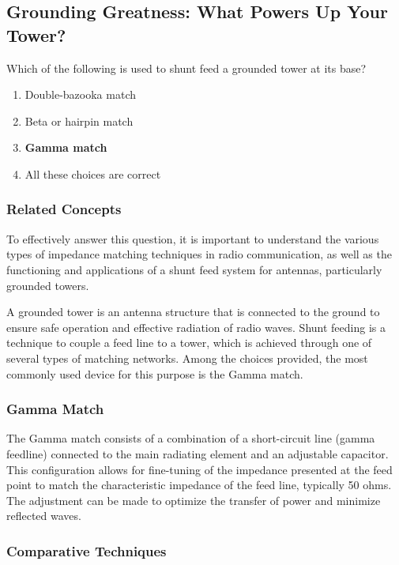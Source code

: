 \subsection{Grounding Greatness: What Powers Up Your Tower?}

\begin{tcolorbox}[colback=gray!10, colframe=black, title=E9E09] Which of the following is used to shunt feed a grounded tower at its base?
\begin{enumerate}[label=\Alph*.]
    \item Double-bazooka match
    \item Beta or hairpin match
    \item \textbf{Gamma match}
    \item All these choices are correct
\end{enumerate} \end{tcolorbox}

\subsubsection{Related Concepts}

To effectively answer this question, it is important to understand the various types of impedance matching techniques in radio communication, as well as the functioning and applications of a shunt feed system for antennas, particularly grounded towers.

A grounded tower is an antenna structure that is connected to the ground to ensure safe operation and effective radiation of radio waves. Shunt feeding is a technique to couple a feed line to a tower, which is achieved through one of several types of matching networks. Among the choices provided, the most commonly used device for this purpose is the Gamma match.

\subsubsection{Gamma Match}

The Gamma match consists of a combination of a short-circuit line (gamma feedline) connected to the main radiating element and an adjustable capacitor. This configuration allows for fine-tuning of the impedance presented at the feed point to match the characteristic impedance of the feed line, typically 50 ohms. The adjustment can be made to optimize the transfer of power and minimize reflected waves.

\subsubsection{Comparative Techniques}

